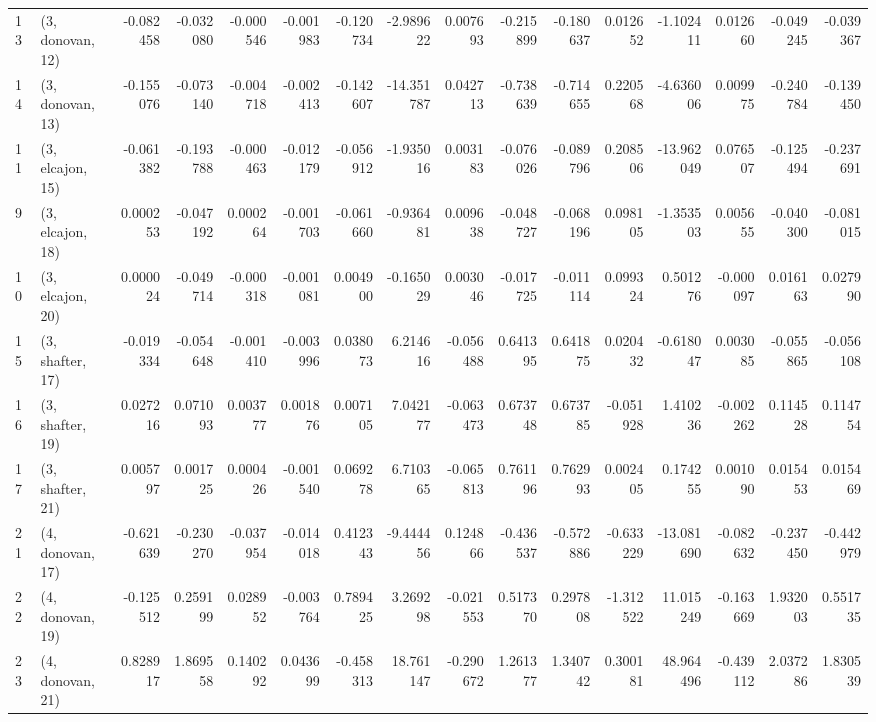 \begin{tabular}{llrrrrrrrrrrrrrr}
13 &  (3, donovan, 12) & -0.082458 & -0.032080 &  -0.000546 & -0.001983 & -0.120734 &  -2.989622 &  0.007693 &  -0.215899 & -0.180637 &  0.012652 &  -1.102411 &  0.012660 & -0.049245 & -0.039367 \\
14 &  (3, donovan, 13) & -0.155076 & -0.073140 &  -0.004718 & -0.002413 & -0.142607 & -14.351787 &  0.042713 &  -0.738639 & -0.714655 &  0.220568 &  -4.636006 &  0.009975 & -0.240784 & -0.139450 \\
11 &  (3, elcajon, 15) & -0.061382 & -0.193788 &  -0.000463 & -0.012179 & -0.056912 &  -1.935016 &  0.003183 &  -0.076026 & -0.089796 &  0.208506 & -13.962049 &  0.076507 & -0.125494 & -0.237691 \\
9  &  (3, elcajon, 18) &  0.000253 & -0.047192 &   0.000264 & -0.001703 & -0.061660 &  -0.936481 &  0.009638 &  -0.048727 & -0.068196 &  0.098105 &  -1.353503 &  0.005655 & -0.040300 & -0.081015 \\
10 &  (3, elcajon, 20) &  0.000024 & -0.049714 &  -0.000318 & -0.001081 &  0.004900 &  -0.165029 &  0.003046 &  -0.017725 & -0.011114 &  0.099324 &   0.501276 & -0.000097 &  0.016163 &  0.027990 \\
15 &  (3, shafter, 17) & -0.019334 & -0.054648 &  -0.001410 & -0.003996 &  0.038073 &   6.214616 & -0.056488 &   0.641395 &  0.641875 &  0.020432 &  -0.618047 &  0.003085 & -0.055865 & -0.056108 \\
16 &  (3, shafter, 19) &  0.027216 &  0.071093 &   0.003777 &  0.001876 &  0.007105 &   7.042177 & -0.063473 &   0.673748 &  0.673785 & -0.051928 &   1.410236 & -0.002262 &  0.114528 &  0.114754 \\
17 &  (3, shafter, 21) &  0.005797 &  0.001725 &   0.000426 & -0.001540 &  0.069278 &   6.710365 & -0.065813 &   0.761196 &  0.762993 &  0.002405 &   0.174255 &  0.001090 &  0.015453 &  0.015469 \\
21 &  (4, donovan, 17) & -0.621639 & -0.230270 &  -0.037954 & -0.014018 &  0.412343 &  -9.444456 &  0.124866 &  -0.436537 & -0.572886 & -0.633229 & -13.081690 & -0.082632 & -0.237450 & -0.442979 \\
22 &  (4, donovan, 19) & -0.125512 &  0.259199 &   0.028952 & -0.003764 &  0.789425 &   3.269298 & -0.021553 &   0.517370 &  0.297808 & -1.312522 &  11.015249 & -0.163669 &  1.932003 &  0.551735 \\
23 &  (4, donovan, 21) &  0.828917 &  1.869558 &   0.140292 &  0.043699 & -0.458313 &  18.761147 & -0.290672 &   1.261377 &  1.340742 &  0.300181 &  48.964496 & -0.439112 &  2.037286 &  1.830539 \\

\end{tabular}
